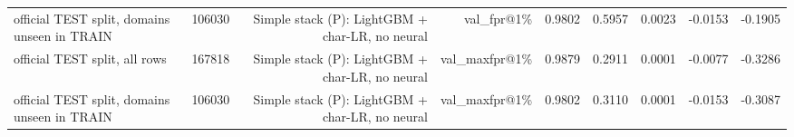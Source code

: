 \begin{table}[t]
\begin{tabular}{llrrrrrrr}
official TEST split, domains unseen in TRAIN & 106030 & Simple stack (P): LightGBM + char-LR, no neural & val\_fpr@1\% & 0.9802 & 0.5957 & 0.0023 & -0.0153 & -0.1905 \\
official TEST split, all rows & 167818 & Simple stack (P): LightGBM + char-LR, no neural & val\_maxfpr@1\% & 0.9879 & 0.2911 & 0.0001 & -0.0077 & -0.3286 \\
official TEST split, domains unseen in TRAIN & 106030 & Simple stack (P): LightGBM + char-LR, no neural & val\_maxfpr@1\% & 0.9802 & 0.3110 & 0.0001 & -0.0153 & -0.3087 \\
\bottomrule
\end{tabular}
\end{table}